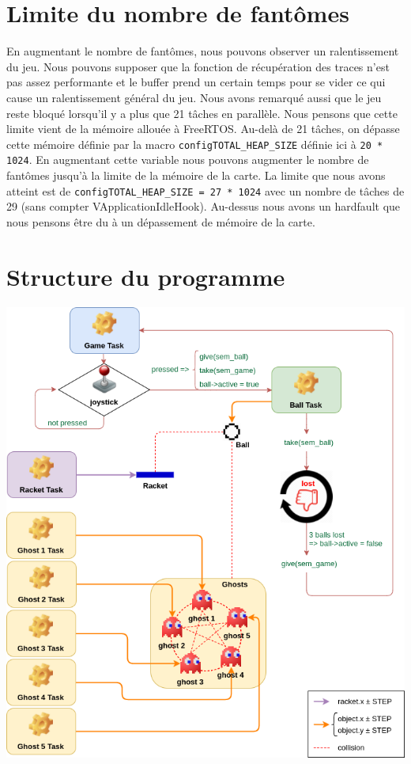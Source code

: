 \documentclass[a4paper]{article}
\begin{document}
\section{Limite du nombre de fantômes}
En augmentant le nombre de fantômes, nous pouvons observer un ralentissement du jeu.
Nous pouvons supposer que la fonction de récupération des traces n'est pas assez
performante et le buffer prend un certain temps pour se vider ce qui cause un ralentissement
général du jeu.
\newline
Nous avons remarqué aussi que le jeu reste bloqué lorsqu'il y a plus que 21 tâches
en parallèle. Nous pensons que cette limite vient de la mémoire allouée à FreeRTOS.
Au-delà de 21 tâches, on dépasse cette mémoire définie par la macro \texttt{configTOTAL_HEAP_SIZE}
définie ici à \texttt{20 * 1024}. En augmentant cette variable nous pouvons augmenter le
nombre de fantômes jusqu'à la limite de la mémoire de la carte. La limite que nous
avons atteint est de \texttt{configTOTAL_HEAP_SIZE = 27 * 1024} avec un nombre de tâches
de 29 (sans compter VApplicationIdleHook). Au-dessus nous avons un hardfault que
nous pensons être du à un dépassement de mémoire de la carte.

\section{Structure du programme}
\begin{center}
\includegraphics[scale=0.6]{ghostbusters.png}
\end{center}
\end{document}

